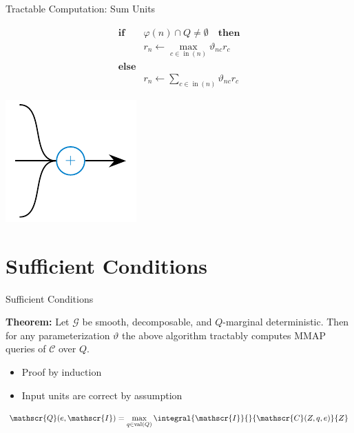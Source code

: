\documentclass[aspectratio=169]{beamer}
\DeclareMathOperator{\val}{val}
\DeclareMathOperator{\nodein}{in}
\begin{document}
  \begin{frame}{Tractable Computation: Sum Units}
    \begin{minipage}[c]{0.49\textwidth}
      \begin{mybox}
        \begin{align*}
          \mathbf{if}\quad &φ(n) \cap Q \neq \emptyset \quad \mathbf{then} \\
          & r_n \longleftarrow \max_{c\in\nodein(n)} ϑ_{nc}r_c \\
          \mathbf{else} \\
          & r_n \longleftarrow \sum_{c\in\nodein(n)} ϑ_{nc}r_c
        \end{align*}
      \end{mybox}
    \end{minipage}
    \hfill
    \begin{minipage}[c]{0.49\textwidth}
      \center
      \includegraphics[scale=1.2]{figures/sum-unit.pdf}
    \end{minipage}
  \end{frame}

\section{Sufficient Conditions}
  \begin{frame}{Sufficient Conditions}
    \begin{mybox}
      \textbf{Theorem:}
      Let $\mathscr{G}$ be smooth, decomposable, and $Q$-marginal deterministic.
      Then for any parameterization $ϑ$ the above algorithm
      tractably computes MMAP queries of $\mathscr{C}$ over $Q$.
    \end{mybox}
    \begin{itemize}
      \item Proof by induction
      \item Input units are correct by assumption
    \end{itemize}
    \[
      \mathscr{Q}(e,\mathscr{I}) = \max_{q\in\val(Q)} \integral{\mathscr{I}}{}{\mathscr{C}(Z,q,e)}{Z}
    \]
  \end{frame}
\end{document}
